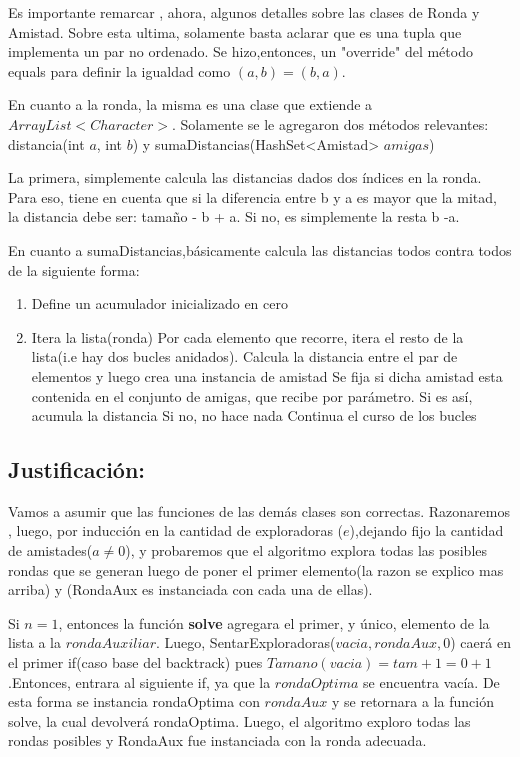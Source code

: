 \documentclass[10pt, a4paper]{article}
\begin{document}
Es importante remarcar , ahora, algunos detalles sobre las clases de Ronda y Amistad.
Sobre esta ultima, solamente basta aclarar que es una tupla que implementa un par no ordenado. Se hizo,entonces, un "override" del método equals para definir la igualdad como $(a,b) = (b,a).$

En cuanto a la ronda, la misma es una clase que extiende a $ArrayList<Character>$. Solamente se le agregaron dos métodos relevantes:
distancia(int $a$, int $b$) y sumaDistancias(HashSet<Amistad> $amigas$)

La primera, simplemente calcula las distancias dados dos índices en la ronda. Para eso, tiene en cuenta que si la diferencia entre b y a es mayor que la mitad, la distancia debe ser: tamaño - b + a. Si no, es simplemente la resta b -a.

En cuanto a sumaDistancias,básicamente calcula las distancias todos contra todos de la siguiente forma:

\begin{enumerate}
 \item Define un acumulador inicializado en cero
\item Itera la lista(ronda)
	\subitem Por cada elemento que recorre, itera el resto de la lista(i.e hay dos bucles anidados).
	\subitem Calcula la distancia entre el par de elementos y luego crea una instancia de amistad
	\subitem Se fija si dicha amistad esta contenida en el conjunto de amigas, que recibe por parámetro.
		\subitem \hspace{6mm} Si es así, acumula la distancia
		\subitem \hspace{6mm} Si no, no hace nada
	\subitem Continua el curso de los bucles
\end{enumerate}


\subsection{Justificación:}

Vamos a asumir que las funciones de las demás clases son correctas. Razonaremos , luego, por inducción en la cantidad de exploradoras ($e$),dejando fijo la cantidad de amistades($a \neq 0$), y probaremos que el algoritmo explora todas las posibles rondas que se generan luego de poner el primer elemento(la razon se explico mas arriba) y (RondaAux es instanciada con cada una de ellas).

Si $n = 1$, entonces la función \textbf{solve} agregara el primer, y único, elemento de la lista a la $rondaAuxiliar$. Luego, SentarExploradoras($vacia,rondaAux,0$) caerá en el primer if(caso base del backtrack) pues $Tamano(vacia) = tam+1 = 0 +1$.Entonces, entrara al siguiente if, ya que la $rondaOptima$ se encuentra vacía. De esta forma se instancia rondaOptima con $rondaAux$ y se retornara a la función solve, la cual devolverá rondaOptima. Luego, el algoritmo exploro todas las rondas posibles y RondaAux fue instanciada con la ronda adecuada.
\end{document}
